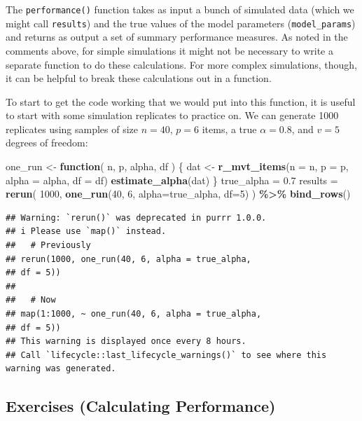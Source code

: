 \documentclass[
]{book}
\newenvironment{Shaded}{\begin{snugshade}}{\end{snugshade}}
\newcommand{\AttributeTok}[1]{\textcolor[rgb]{0.13,0.29,0.53}{#1}}
\newcommand{\ControlFlowTok}[1]{\textcolor[rgb]{0.13,0.29,0.53}{\textbf{#1}}}
\newcommand{\DecValTok}[1]{\textcolor[rgb]{0.00,0.00,0.81}{#1}}
\newcommand{\FloatTok}[1]{\textcolor[rgb]{0.00,0.00,0.81}{#1}}
\newcommand{\FunctionTok}[1]{\textcolor[rgb]{0.13,0.29,0.53}{\textbf{#1}}}
\newcommand{\NormalTok}[1]{#1}
\newcommand{\OtherTok}[1]{\textcolor[rgb]{0.56,0.35,0.01}{#1}}
\newcommand{\SpecialCharTok}[1]{\textcolor[rgb]{0.81,0.36,0.00}{\textbf{#1}}}
\begin{document}
The \texttt{performance()} function takes as input a bunch of simulated data (which we might call \texttt{results}) and the true values of the model parameters (\texttt{model\_params}) and returns as output a set of summary performance measures. As noted in the comments above, for simple simulations it might not be necessary to write a separate function to do these calculations. For more complex simulations, though, it can be helpful to break these calculations out in a function.

To start to get the code working that we would put into this function, it is useful to start with some simulation replicates to practice on.
We can generate 1000 replicates using samples of size \(n = 40\), \(p = 6\) items, a true \(\alpha = 0.8\), and \(v = 5\) degrees of freedom:

\begin{Shaded}
\begin{Highlighting}[]
\NormalTok{one\_run }\OtherTok{\textless{}{-}} \ControlFlowTok{function}\NormalTok{( n, p, alpha, df ) \{}
\NormalTok{    dat }\OtherTok{\textless{}{-}} \FunctionTok{r\_mvt\_items}\NormalTok{(}\AttributeTok{n =}\NormalTok{ n, }\AttributeTok{p =}\NormalTok{ p, }\AttributeTok{alpha =}\NormalTok{ alpha, }\AttributeTok{df =}\NormalTok{ df)}
    \FunctionTok{estimate\_alpha}\NormalTok{(dat)}
\NormalTok{\}}
\NormalTok{true\_alpha }\OtherTok{=} \FloatTok{0.7}
\NormalTok{results }\OtherTok{=} \FunctionTok{rerun}\NormalTok{( }\DecValTok{1000}\NormalTok{, }\FunctionTok{one\_run}\NormalTok{(}\DecValTok{40}\NormalTok{, }\DecValTok{6}\NormalTok{, }\AttributeTok{alpha=}\NormalTok{true\_alpha, }\AttributeTok{df=}\DecValTok{5}\NormalTok{) ) }\SpecialCharTok{\%\textgreater{}\%}
  \FunctionTok{bind\_rows}\NormalTok{()}
\end{Highlighting}
\end{Shaded}

\begin{verbatim}
## Warning: `rerun()` was deprecated in purrr 1.0.0.
## i Please use `map()` instead.
##   # Previously
## rerun(1000, one_run(40, 6, alpha = true_alpha,
## df = 5))
## 
##   # Now
## map(1:1000, ~ one_run(40, 6, alpha = true_alpha,
## df = 5))
## This warning is displayed once every 8 hours.
## Call `lifecycle::last_lifecycle_warnings()` to see where this warning was generated.
\end{verbatim}

\subsection{Exercises (Calculating Performance)}\label{exercises-calculating-performance}
\end{document}
